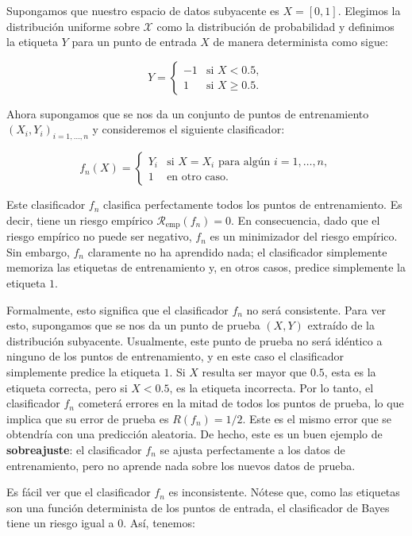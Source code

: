 \documentclass{report}
\begin{document}
Supongamos que nuestro espacio de datos subyacente es \(X = [0,1]\). Elegimos la distribución uniforme sobre 
\(\mathcal{X}\) como la distribución de probabilidad y definimos la etiqueta \(Y\) para un punto de entrada \(X\) de 
manera determinista como sigue:

\[
Y = 
\begin{cases} 
-1 & \text{si } X < 0.5, \\ 
1 & \text{si } X \geq 0.5.
\end{cases}
\]

Ahora supongamos que se nos da un conjunto de puntos de entrenamiento \((X_i, Y_i)_{i=1,\dots,n}\) y 
consideremos el siguiente clasificador:

\[
f_n(X) = 
\begin{cases} 
Y_i & \text{si } X = X_i \text{ para algún } i = 1, \dots, n, \\ 
1 & \text{en otro caso.}
\end{cases}
\]

Este clasificador \(f_n\) clasifica perfectamente todos los puntos de entrenamiento. Es decir, tiene un 
riesgo empírico \(\mathcal{R}_{\text{emp}}(f_n) = 0\). En consecuencia, dado que el riesgo empírico no puede ser 
negativo, \(f_n\) es un minimizador del riesgo empírico. Sin embargo, \(f_n\) claramente no ha aprendido 
nada; el clasificador simplemente memoriza las etiquetas de entrenamiento y, en otros casos, predice 
simplemente la etiqueta \(1\).\newline

Formalmente, esto significa que el clasificador \(f_n\) no será consistente. Para ver esto, supongamos que 
se nos da un punto de prueba \((X, Y)\) extraído de la distribución subyacente. Usualmente, este punto de 
prueba no será idéntico a ninguno de los puntos de entrenamiento, y en este caso el clasificador simplemente 
predice la etiqueta \(1\). Si \(X\) resulta ser mayor que \(0.5\), esta es la etiqueta correcta, pero si 
\(X < 0.5\), es la etiqueta incorrecta. Por lo tanto, el clasificador \(f_n\) cometerá errores en la mitad 
de todos los puntos de prueba, lo que implica que su error de prueba es \(R(f_n) = 1/2\). Este es el mismo 
error que se obtendría con una predicción aleatoria. De hecho, este es un buen ejemplo de 
\textbf{sobreajuste}: el clasificador \(f_n\) se ajusta perfectamente a los datos de entrenamiento, pero no 
aprende nada sobre los nuevos datos de prueba.\newline

Es fácil ver que el clasificador \(f_n\) es inconsistente. Nótese que, como las etiquetas son una función 
determinista de los puntos de entrada, el clasificador de Bayes tiene un riesgo igual a \(0\). Así, tenemos:
\end{document}
